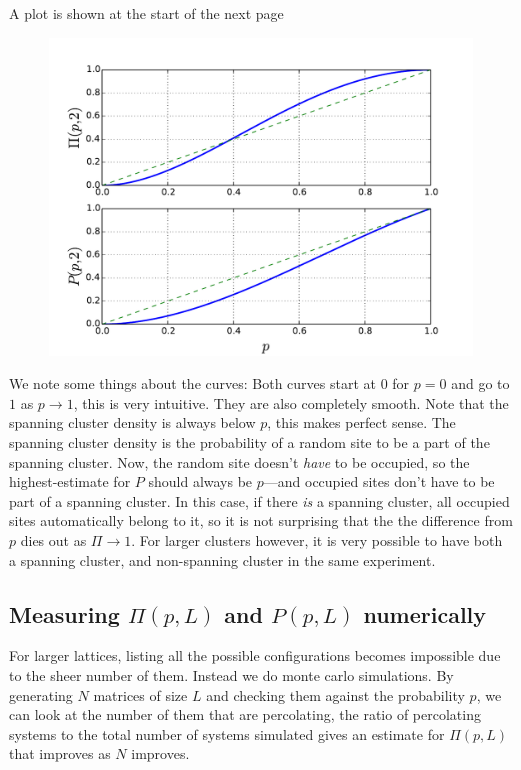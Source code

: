 \documentclass[a4paper, 11pt, notitlepage, english]{article}
\begin{document}
A plot is shown at the start of the next page 
\begin{figure}[ht]
\centering
\includegraphics[width=\textwidth]{11.pdf}
\end{figure}

\newpage
We note some things about the curves: Both curves start at $0$ for $p=0$ and go to $1$ as $p\to 1$, this is very intuitive. They are also completely smooth. Note that the spanning cluster density is always below $p$, this makes perfect sense. The spanning cluster density is the probability of a random site to be a part of the spanning cluster. Now, the random site doesn't \emph{have} to be occupied, so the highest-estimate for $P$ should always be $p$---and occupied sites don't have to be part of a spanning cluster. In this case, if there \emph{is} a spanning cluster, all occupied sites automatically belong to it, so it is not surprising that the the difference from $p$ dies out as $\Pi\to 1$. For larger clusters however, it is very possible to have both a spanning cluster, and non-spanning cluster in the same experiment.

\subsection*{Measuring $\Pi(p,L)$ and $P(p, L)$ numerically}

For larger lattices, listing all the possible configurations becomes impossible due to the sheer number of them. Instead we do monte carlo simulations. By generating $N$ matrices of size $L$ and checking them against the probability $p$, we can look at the number of them that are percolating, the ratio of percolating systems to the total number of systems simulated gives an estimate for $\Pi(p,L)$ that improves as $N$ improves.
\end{document}
